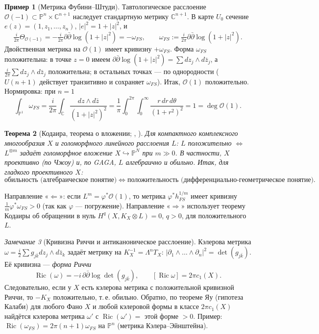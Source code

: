 \documentclass[11pt,a4paper]{article}
\theoremstyle{plain}
\newtheorem{theorem}{Теорема}[section]
\theoremstyle{definition}
\newtheorem{example}[theorem]{Пример}
\theoremstyle{remark}
\newtheorem{remark}[theorem]{Замечание}
\renewcommand{\C}{\mathbb{C}}
\newcommand{\PP}{\mathbb{P}}
\newcommand{\cO}{\mathcal{O}}
\DeclareMathOperator{\Ric}{Ric}
\begin{document}
\begin{example}[Метрика Фубини--Штуди]\label{ex:FS}
Тавтологическое расслоение $\cO(-1)\subset\PP^n\times\C^{n+1}$ наследует стандартную метрику $\C^{n+1}$.
В карте $U_0$ сечение $e(z)=(1,z_1,\dots,z_n)$, $|e|^2=1+|z|^2$, и
\[
\tfrac{i}{2\pi}\Theta_{\cO(-1)}=-\tfrac{i}{2\pi}\partial\bar\partial\log(1+|z|^2)=-\omega_{FS},\qquad
\omega_{FS}:=\tfrac{i}{2\pi}\partial\bar\partial\log(1+|z|^2).
\]
Двойственная метрика на $\cO(1)$ имеет кривизну $+\omega_{FS}$. Форма $\omega_{FS}$ положительна: в точке
$z=0$ имеем $\partial\bar\partial\log(1+|z|^2)=\sum dz_j\wedge d\bar z_j$, а $\frac{i}{2\pi}\sum dz_j\wedge
d\bar z_j$ положительна; в остальных точках --- по однородности ($U(n+1)$ действует транзитивно и
сохраняет $\omega_{FS}$). Итак, $\cO(1)$ положительно. Нормировка: при $n=1$
\[
\int_{\PP^1}\omega_{FS}=\frac{i}{2\pi}\int_\C\frac{dz\wedge d\bar z}{(1+|z|^2)^2}
=\frac1\pi\int_0^{2\pi}\!\!\int_0^\infty\frac{r\,dr\,d\theta}{(1+r^2)^2}=1=\deg\cO(1).
\]
\end{example}

\begin{theorem}[{Кодаира, теорема о вложении; \cite[гл.~1, \S\,4]{GH}, \cite[5.3]{Hu}}]\label{thm:Kodaira}
Для компактного комплексного многообразия $X$ и голоморфного линейного расслоения $L$:
$L$ положительно $\iff$ $L^{\otimes m}$ задаёт голоморфное вложение $X\hookrightarrow\PP^N$ при $m\gg0$.
В частности, $X$ проективно (по Чжоу) и, по GAGA, $L$ алгебраично и обильно. Итак, для гладкого
проективного $X$:
\[
\text{обильность (алгебраическое понятие)}\iff\text{положительность (дифференциально-геометрическое понятие)}.
\]
\end{theorem}
Направление «$\Leftarrow$»: если $L^m=\varphi^*\cO(1)$, то метрика $\varphi^*h_{FS}^{1/m}$ имеет кривизну
$\frac1m\varphi^*\omega_{FS}>0$ (так как $\varphi$ --- погружение). Направление «$\Rightarrow$» использует
теорему Кодаиры об обращении в нуль $H^q(X,K_X\otimes L)=0$, $q>0$, для положительного $L$.

\begin{remark}[Кривизна Риччи и антиканоническое расслоение]
Кэлерова метрика $\omega=\frac i2\sum g_{j\bar k}dz_j\wedge d\bar z_k$ задаёт метрику на
$K_X^{-1}=\Lambda^nT_X$: $|\partial_1\wedge\dots\wedge\partial_n|^2=\det(g_{j\bar k})$. Её кривизна ---
\emph{форма Риччи}
\[
\Ric(\omega)=-i\,\partial\bar\partial\log\det(g_{j\bar k}),\qquad [\Ric\omega]=2\pi c_1(X).
\]
Следовательно, если у $X$ есть кэлерова метрика с положительной кривизной Риччи, то $-K_X$ положительно,
т.\,е. обильно. Обратно, по теореме Яу (гипотеза Калаби) для любого Фано $X$ и любой кэлеровой формы в
классе $2\pi c_1(X)$ найдётся кэлерова метрика $\omega'$ с $\Ric(\omega')=$ этой форме $>0$. Пример:
$\Ric(\omega_{FS})=2\pi(n+1)\omega_{FS}$ на $\PP^n$ (метрика Кэлера--Эйнштейна).
\end{remark}
\end{document}

